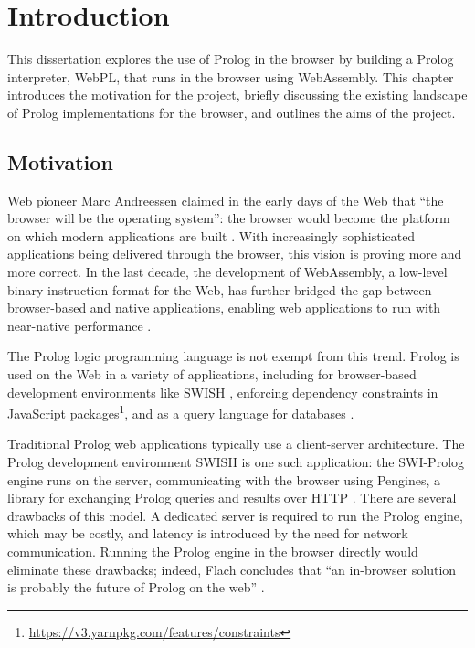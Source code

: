 \chapter{Introduction}

This dissertation explores the use of Prolog in the browser by building a Prolog interpreter, WebPL, that runs in the browser using WebAssembly. This chapter introduces the motivation for the project, briefly discussing the existing landscape of Prolog implementations for the browser, and outlines the aims of the project.

\section{Motivation}

\label{sec:motivation}

Web pioneer Marc Andreessen claimed in the early days of the Web that ``the browser will be the operating system'': the browser would become the platform on which modern applications are built \cite{kosnerAlwaysEarlyMarc2012}. With increasingly sophisticated applications being delivered through the browser, this vision is proving more and more correct. In the last decade, the development of WebAssembly, a low-level binary instruction format for the Web, has further bridged the gap between browser-based and native applications, enabling web applications to run with near-native performance \cite{haasBringingwebspeed2017}.

The Prolog logic programming language is not exempt from this trend. Prolog is used on the Web in a variety of applications, including for browser-based development environments like SWISH \cite{wielemakerSWISHSWIPrologSharing2015}, enforcing dependency constraints in JavaScript packages\footnote{\url{https://v3.yarnpkg.com/features/constraints}}, and as a query language for databases \cite{wielemakerUsingPrologFundament2007}.

Traditional Prolog web applications typically use a client-server architecture. The Prolog development environment SWISH is one such application: the SWI-Prolog engine runs on the server, communicating with the browser using Pengines, a library for exchanging Prolog queries and results over HTTP \cite{lagerPenginesWebLogic2014}. There are several drawbacks of this model. A dedicated server is required to run the Prolog engine, which may be costly, and latency is introduced by the need for network communication. Running the Prolog engine in the browser directly would eliminate these drawbacks; indeed, Flach concludes that ``an in-browser solution is probably the future of Prolog on the web'' \cite{flachSimplyLogicalFirst2023}.

